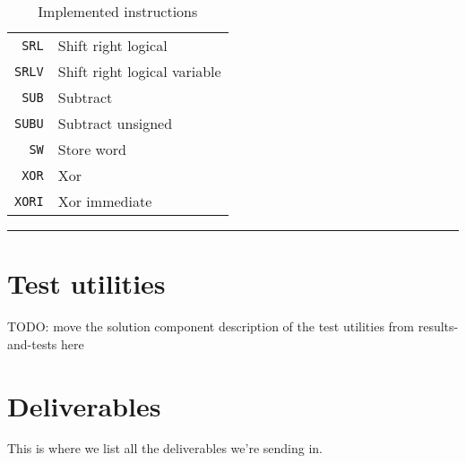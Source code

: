 \begin{table}
\begin{center}
\begin{tabular}{r|l}
            \texttt{SRL} & Shift right logical \\
            \texttt{SRLV} & Shift right logical variable \\
            \texttt{SUB} & Subtract \\
            \texttt{SUBU} & Subtract unsigned \\
            \texttt{SW} & Store word \\
            \texttt{XOR} & Xor \\
            \texttt{XORI} & Xor immediate \\
        \end{tabular}
        \smallskip
        \hrule
        \smallskip
        \caption{Implemented instructions}
        \label{table:implemented-instructions}
    \end{center}
\end{table}

\section{Test utilities}

TODO: move the solution component description of the test utilities from results-and-tests here

\section{Deliverables}

This is where we list all the deliverables we're sending in.
